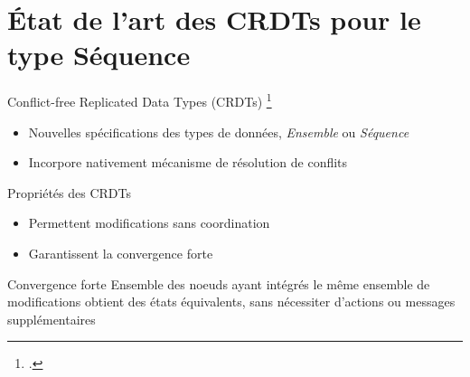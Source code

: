 \section{État de l'art des CRDTs pour le type Séquence}

\begin{frame}{Conflict-free Replicated Data Types (CRDTs) \footcite{shapiro_2011_crdt}}
    \begin{itemize}
        \item Nouvelles spécifications des types de données, \eg \emph{Ensemble} ou \emph{Séquence}
        \item Incorpore nativement mécanisme de résolution de conflits
    \end{itemize}
    \pause
    \begin{block}{Propriétés des CRDTs}
        \begin{itemize}
            \item Permettent modifications \alert{sans coordination}
            \item Garantissent la \alert{convergence forte}
        \end{itemize}
    \end{block}
    \pause
    \begin{block}{Convergence forte}
        Ensemble des noeuds ayant intégrés le même ensemble de modifications obtient des états équivalents, sans nécessiter d'actions ou messages supplémentaires
    \end{block}
\end{frame}

